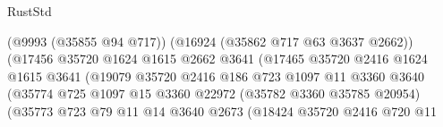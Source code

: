 \begin{lexlean}{RustStd}
\begin{coremodule}
                                                (@9993 (@35855 @94 @717))
                                                (@16924 (@35862 @717 @63 @3637 @2662))
                                                (@17456
                                                  @35720
                                                  @1624
                                                  @1615
                                                  @2662
                                                  @3641
                                                  (@17465
                                                    @35720
                                                    @2416
                                                    @1624
                                                    @1615
                                                    @3641
                                                    (@19079
                                                      @35720
                                                      @2416
                                                      @186
                                                      @723
                                                      @1097
                                                      @11
                                                      @3360
                                                      @3640
                                                      (@35774
                                                        @725
                                                        @1097
                                                        @15
                                                        @3360
                                                        @22972
                                                        (@35782 @3360 @35785 @20954)
                                                        (@35773
                                                          @723
                                                          @79
                                                          @11
                                                          @14
                                                          @3640
                                                          @2673
                                                          (@18424
                                                            @35720
                                                            @2416
                                                            @720
                                                            @11

\end{coremodule}
\end{lexlean}
